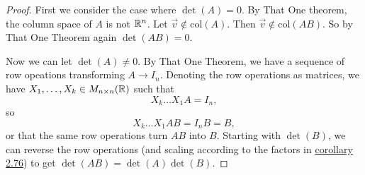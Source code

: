 \begin{proof}
	First we consider the case where $\det (A)=0$. By That One theorem, the column space of $A$ is not $\mathbb{R}^n$. Let $\vec{v}\notin \textrm{col}(A)$. Then $\vec{v}\notin \textrm{col} (AB)$. So by That One Theorem again $\det (AB)=0$.
	
	Now we can let $\det (A)\neq 0$. By That One Theorem, we have a sequence of row opeations transforming $A\to I_n$. Denoting the row operations as matrices, we have $X_1,\ldots,X_k\in M_{n\times n}(\mathbb{R})$ such that\[
	X_k \ldots X_1A=I_n,
	\]
	so \[
		X_k \ldots X_1AB =I_nB=B,
	\]
	or that the same row operations turn $AB$ into $B$. Starting with $\det (B)$, we can reverse the row operations (and scaling according to the factors in \hyperref[prop:2.75]{corollary 2.76}) to get $\det(AB)=\det(A)\det(B)$.
\end{proof}
\exercises
